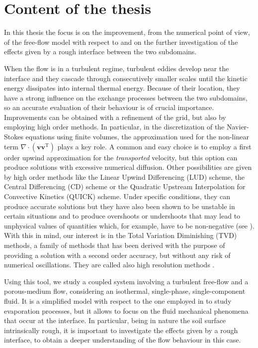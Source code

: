 \section{Content of the thesis}
In this thesis the focus is on the improvement, from the numerical point of view, of the free-flow model with respect to \cite{tesi:fetzer} and on the further investigation of the effects given by a rough interface between the two subdomains.

When the flow is in a turbulent regime, turbulent eddies develop near the interface and 
they cascade through consecutively smaller scales until the kinetic energy 
dissipates into internal thermal energy. Because of their location, they have 
a strong influence on the exchange processes between the two subdomains, so an 
accurate evaluation of their behaviour is of crucial importance. Improvements 
can be obtained with a refinement of the grid, but also by employing 
high order methods. In 
particular, in the discretization of the Navier-Stokes equations using finite 
volumes, the approximation used for the non-linear term 
$\nabla \cdot (\mathbf{v} \mathbf{v}^\mathrm{T})$ plays a key role. A common and easy 
choice is to employ a first order upwind approximation for the 
\emph{transported} velocity, but this option can produce solutions with 
excessive numerical diffusion. Other possibilities are given by high order 
methods 
like the Linear Upwind Differencing (LUD) scheme, the Central Differencing (CD) 
scheme or the Quadratic Upstream Interpolation for Convective Kinetics (QUICK) 
scheme. Under specific conditions, they can produce 
accurate solutions but they have also been shown to be unstable in certain 
situations and to produce overshoots or undershoots that 
may lead to unphysical values of quantities which, for example, have to be 
non-negative (see \cite{main:vermal}). With this in mind, our interest is in 
the Total Variation Diminishing (TVD) methods, a family of methods that has 
been derived with the purpose of providing a solution with a second order 
accuracy, but without any risk of numerical oscillations. They are called also 
high resolution methods \cite{tvd:monotonicity}.

Using this tool, we study a coupled system involving a turbulent free-flow and a porous-medium flow, considering an isothermal, single-phase, single-component fluid. It is a simplified model with respect to the one employed in \cite{tesi:fetzer} to study evaporation processes, but it allows to focus on the fluid mechanical phenomena that occur at the interface. In particular, being in nature the soil surface intrinsically rough, it is important to investigate the effects given by a rough interface, to obtain a deeper understanding of the flow behaviour in this case. 

